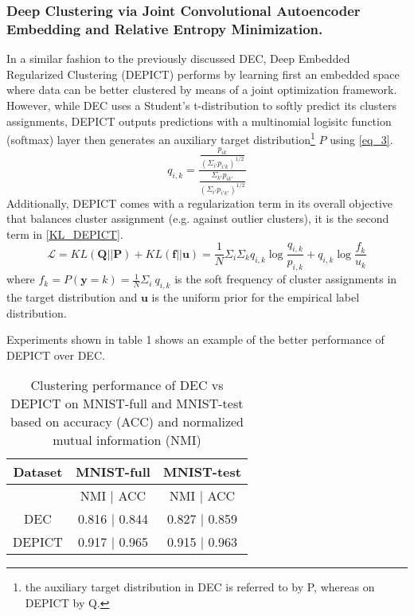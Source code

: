 \documentclass[runningheads]{llncs}
\begin{document}
\subsubsection{Deep Clustering via Joint Convolutional Autoencoder Embedding and Relative Entropy Minimization.}
In a similar fashion to the previously discussed DEC, Deep Embedded Regularized Clustering (DEPICT) \cite{15} performs by learning first an embedded space where data can be better clustered by means of a joint optimization framework. However, while DEC uses a Student's t-distribution to softly predict its clusters assignments, DEPICT outputs predictions with a multinomial logisitc function (softmax) layer then generates an auxiliary target distribution\footnote{the auxiliary target distribution in DEC is referred to by P, whereas on DEPICT by Q.} ${P}$ using \eqref{eq_3}.
\begin{equation}
q_{i,k} = \frac{\frac{p_{i k}}{(\Sigma_{i'}p_{i' k})^{1/2}}}{\frac{\Sigma_{k'}p_{i k'}}{(\Sigma_{i'}p_{i' k'})^{1/2}}}
\label{eq_3}
\end{equation}
Additionally, DEPICT comes with a regularization term in its overall objective that balances cluster assignment (e.g. against outlier clusters), it is the second term in \eqref{KL_DEPICT}.
\begin{equation}
\mathcal{L} = KL(\boldsymbol{Q}||\boldsymbol{P}) + KL(\boldsymbol{f}||\boldsymbol{u}) = \frac{1}{N}\Sigma_i\Sigma_k q_{i,k} \log\frac{q_{i,k}}{p_{i,k}} + q_{i,k}\log\frac{f_{k}}{u_{k}}
\label{KL_DEPICT}
\end{equation}
where $f_k = P(\boldsymbol{y} = k) = \frac{1}{N} \Sigma_i\ q_{i,k}$ is the soft frequency of cluster assignments in the target distribution and $\boldsymbol{u}$ is the uniform prior for the empirical label distribution.

Experiments shown in table 1 shows an example of the better performance of DEPICT over DEC.
\begin{table}[h!]
\centering
 \begin{tabular}{|c | c | c |} 
 \hline
 Dataset & MNIST-full & MNIST-test \\ [0.ex] 
 \hline
  \hline
   & NMI | ACC & NMI | ACC \\ [0.7ex] 
 \hline\hline
 DEC\cite{15} & 0.816 | 0.844 & 0.827 | 0.859 \\ 
 \hline
 DEPICT\cite{15} & 0.917 | 0.965 & 0.915 | 0.963 \\
 \hline
\end{tabular}
\caption{Clustering performance of DEC vs DEPICT on MNIST-full and MNIST-test based on accuracy (ACC) and normalized mutual information (NMI)}
\end{table}
\end{document}
